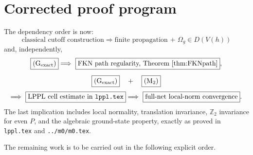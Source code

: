 \documentclass[11pt,a4paper]{article}
\theoremstyle{remark}
\newcommand{\Om}{\Omega}
\begin{document}
\section{Corrected proof program}

The dependency order is now:
\[
 \boxed{\text{classical cutoff construction}}
 \Longrightarrow
 \boxed{\text{finite propagation + }\Om_g\in D(V(h))}
\]
and, independently,
\[
 \begin{gathered}
 \boxed{\text{(G$_\mathrm{exact}$)}}
 \Longrightarrow\ \boxed{\text{FKN path regularity, Theorem~\ref{thm:FKNpath}}},\\[5pt]
 \boxed{\text{(G$_\mathrm{exact}$)}}\quad+\quad\boxed{\text{(M$_2$)}}\\[3pt]
 \Longrightarrow\ \boxed{\text{LPPL cell estimate in \texttt{lppl.tex}}}
 \Longrightarrow\ \boxed{\text{full-net local-norm convergence}}.
 \end{gathered}
\]
The last implication includes local normality, translation invariance, $\mathbb Z_2$ invariance
for even $P$, and the algebraic ground-state property, exactly as proved in \texttt{lppl.tex} and
\texttt{../m0/m0.tex}.

The remaining work is to be carried out in the following explicit order.
\end{document}

